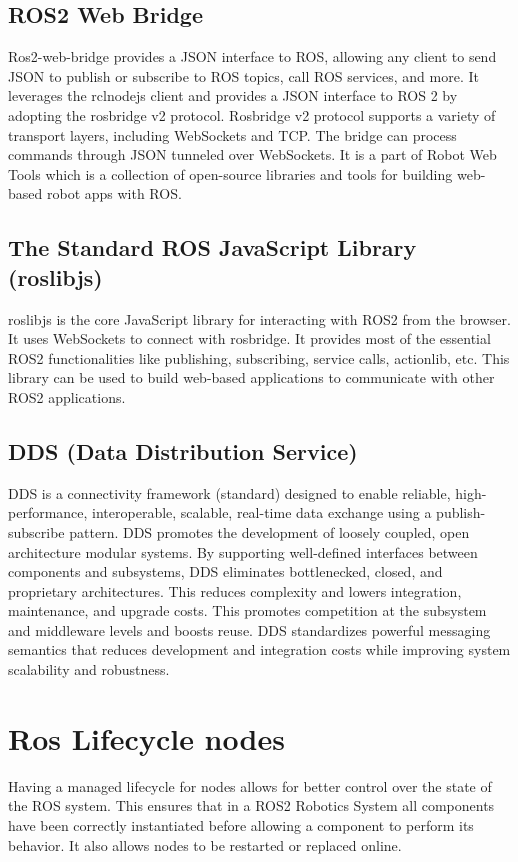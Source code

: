 	\subsection{ROS2 Web Bridge}
	\label{Grundlagen:ROS2:2WebBridge}
	Ros2-web-bridge provides a JSON interface to ROS, allowing any client to send JSON to publish or subscribe to ROS topics, call ROS services, and more. It leverages the rclnodejs client and provides a JSON interface to ROS 2 by adopting the rosbridge v2 protocol. Rosbridge v2 protocol supports a variety of transport layers, including WebSockets and TCP. The bridge can process commands through JSON tunneled over WebSockets. It is a part of  Robot Web Tools which is a collection of open-source libraries and tools for building web-based robot apps with ROS.\cite{ros2OnWB}

	\subsection{The Standard ROS JavaScript Library (roslibjs) }
	\label{Grundlagen:ROS2:RosLibJS}
	roslibjs is the core JavaScript library for interacting with ROS2 from the browser. It uses WebSockets to connect with rosbridge. It provides most of the essential ROS2 functionalities like publishing, subscribing, service calls, actionlib, etc. This library can be used to build web-based applications to communicate with other ROS2 applications.
	

	\subsection{DDS (Data Distribution Service)}
	\label{Grundlagen:DDS}
	DDS is a connectivity framework (standard) designed to enable reliable, high-performance, interoperable, scalable, real-time data exchange using a publish-subscribe pattern. DDS promotes the development of loosely coupled, open architecture modular systems. By supporting well-defined interfaces between components and subsystems, DDS eliminates bottlenecked, closed, and proprietary architectures. This reduces complexity and lowers integration, maintenance, and upgrade costs. This promotes competition at the subsystem and middleware levels and boosts reuse. DDS standardizes powerful messaging semantics that reduces development and integration costs while improving system scalability and robustness.\cite{ros2OnDDSRti}
		
	
	\section{Ros Lifecycle nodes}
	\label{Grundlagen:ROS2:Lifecycle}
	Having a managed lifecycle for nodes allows for better control over the state of the ROS system. This ensures that in a ROS2 Robotics System all components have been correctly instantiated before allowing a component to perform its behavior. It also allows nodes to be restarted or replaced online.

